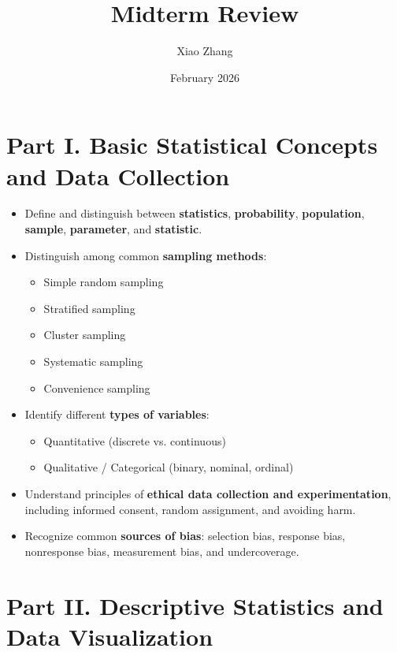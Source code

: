 \documentclass[11pt]{article}
\title{Midterm Review}
\author{Xiao Zhang}
\date{February 2026}
\begin{document}
\maketitle


\section*{Part I. Basic Statistical Concepts and Data Collection}

\begin{itemize}[leftmargin=*]
\item Define and distinguish between \textbf{statistics}, \textbf{probability}, \textbf{population}, \textbf{sample}, \textbf{parameter}, and \textbf{statistic}.
\item Distinguish among common \textbf{sampling methods}:
\begin{itemize}
\item Simple random sampling
\item Stratified sampling
\item Cluster sampling
\item Systematic sampling
\item Convenience sampling
\end{itemize}
\item Identify different \textbf{types of variables}:
\begin{itemize}
\item Quantitative (discrete vs. continuous)
\item Qualitative / Categorical (binary, nominal, ordinal)
\end{itemize}
\item Understand principles of \textbf{ethical data collection and experimentation}, including informed consent, random assignment, and avoiding harm.
\item Recognize common \textbf{sources of bias}: selection bias, response bias, nonresponse bias, measurement bias, and undercoverage.
\end{itemize}

\section*{Part II. Descriptive Statistics and Data Visualization}
\end{document}
